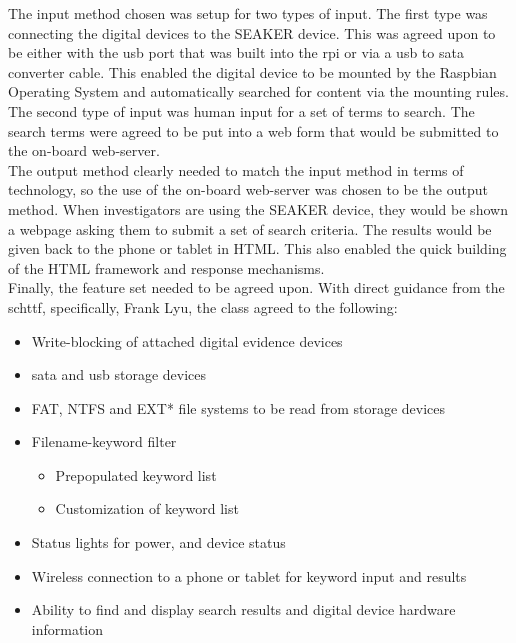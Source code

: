 \documentclass[12pt]{article}
\begin{document}
The input method chosen was setup for two types of input.  The first type was connecting
the digital devices to the SEAKER device.  This was agreed upon to be either with the \gls{usb}
port that was built into the \gls{rpi} or via a \gls{usb} to \gls{sata} converter cable.  This enabled
the digital device to be mounted by the Raspbian Operating System and automatically 
searched for content via the mounting rules.  The second type of input was human input
for a set of terms to search.  The search terms were agreed to be put into a web form that
would be submitted to the on-board web-server.\\

The output method clearly needed to match the input method in terms of technology, so the
use of the on-board web-server was chosen to be the output method.  When investigators are
using the SEAKER device, they would be shown a webpage asking them to submit a 
set of search criteria.  The results would be given back to the phone or tablet in HTML.
This also enabled the quick building of the HTML framework and response mechanisms.\\

Finally, the feature set needed to be agreed upon.  With direct guidance from the \gls{schttf},
specifically, Frank Lyu, the class agreed to the following:

\vspace{0.5 cm}
\begin{itemize}
  \item Write-blocking of attached digital evidence devices
  \item \gls{sata} and \gls{usb} storage devices
  \item FAT, NTFS and EXT* file systems to be read from storage devices
  \item Filename-keyword filter
  \begin{itemize}
    \item Prepopulated keyword list
    \item Customization of keyword list
  \end{itemize}
  \item Status lights for power, and device status
  \item Wireless connection to a phone or tablet for keyword input and results
  \item Ability to find and display search results and digital device hardware information
\end{itemize}
\vspace{0.5 cm}
\end{document}
